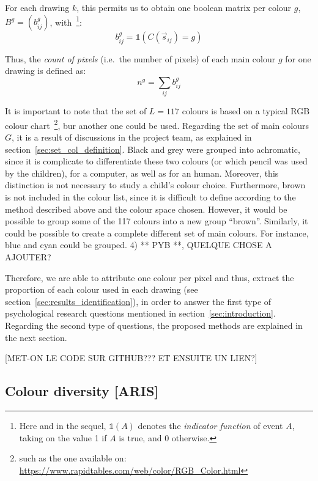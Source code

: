 \documentclass[11pt,a4paper]{article}
\begin{document}
For each drawing $k$, this permits us to obtain one
boolean matrix per colour $g$, $B^{g} = (b_{ij}^{g})$, with~\footnote{Here and in the sequel, $\mathds{1}(A)$ denotes the \textit{indicator function} of event $A$, taking on the value 1 if $A$ is true, and 0 otherwise.}:
\begin{equation}
	b_{ij}^{g} =  \mathds{1}(C(\vec{s}_{ij}) = g)
\end{equation}

Thus, the \textit{count of pixels}  (i.e.~the number of pixels) of each main colour $g$ for one drawing is defined as:
\begin{equation}
	n^{g} = \sum_{ij}b_{ij}^{g}
\end{equation}


It is important to note that the set of $L=117$ colours is based on a typical RGB colour chart~\footnote{such as the one available on: \url{https://www.rapidtables.com/web/color/RGB_Color.html}}, bur another one could be used. Regarding the set of main colours $G$, it is a result of discussions in the project team, as explained in section~\ref{sec:set_col_definition}. Black and grey were grouped into achromatic, since it is complicate to differentiate these two colours (or which pencil was used by the children), for a computer, as well as for an human. Moreover, this distinction is not necessary to study a child's colour choice. Furthermore, brown is not included in the colour list, since it is difficult to define according to the method described above and the colour space chosen. However, it would be possible to group some of the 117 colours into a new group ``brown''. Similarly, it could be possible to create a complete different set of main colours. For instance, blue and cyan could be grouped.
{\color{red} 4) ** PYB **, QUELQUE CHOSE A AJOUTER?}

Therefore, we are able to attribute one colour per pixel and thus, extract the proportion of
each colour used in each drawing (see section~\ref{sec:results_identification}), in order to answer the first type of psychological research questions mentioned in section~\ref{sec:introduction}. 
Regarding the second type of questions, the proposed methods are explained in the next section.



{\color{red}[MET-ON LE CODE SUR GITHUB??? ET ENSUITE UN LIEN?]}


\subsection{Colour diversity [ARIS]}
\label{sec:diversity}
\end{document}
